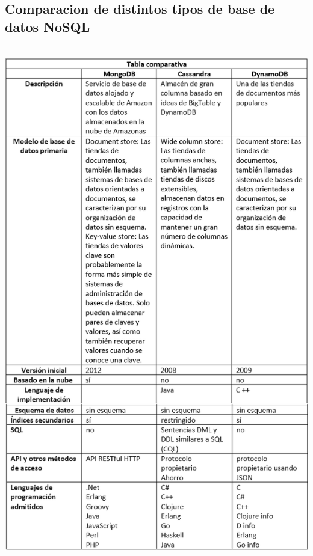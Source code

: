 \documentclass[twoside,onecolumn]{article}
\begin{document}
\begin{flushright}
\begin{itemize}
\subsection{Comparacion de distintos tipos de base de datos NoSQL}
\textbf{}\\
\includegraphics[scale=0.7]{Imagenes/tabla1.png}
\textbf{}\\

\end{itemize}
\end{flushright}
\end{document}
